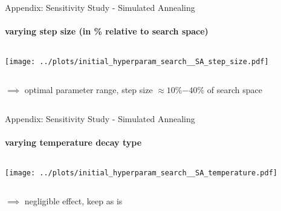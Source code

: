 \documentclass[11pt,aspectratio=169]{beamer}
\begin{document}
%
%

\begin{closingframe}{Appendix: Sensitivity Study - Simulated Annealing}
    \framesubtitle{varying \textbf{step size} (in \% relative to search space)}

    \begin{columns}
    \begin{column}{0.8\textwidth}
        \texttt{[image: ../plots/initial\_hyperparam\_search\_\_SA\_step\_size.pdf]}
    \end{column}
    \end{columns}

    \begin{columns}
        \begin{column}{0.8\textwidth}
            $\implies$ optimal parameter range, step size $\approx 10$\%$-40$\% of search space
        \end{column}
        \begin{column}{0.1\textwidth}
            \tiny{}
        \end{column}
    \end{columns}

\end{closingframe}

%
%

\begin{closingframe}{Appendix: Sensitivity Study - Simulated Annealing}
    \framesubtitle{varying \textbf{temperature decay type}}

    \begin{columns}
    \begin{column}{0.8\textwidth}
        \texttt{[image: ../plots/initial\_hyperparam\_search\_\_SA\_temperature.pdf]}
    \end{column}
    \end{columns}

    \begin{columns}
        \begin{column}{0.8\textwidth}
            $\implies$ negligible effect, keep as is
        \end{column}
        \begin{column}{0.1\textwidth}
            \tiny{}
        \end{column}
    \end{columns}
\end{closingframe}
\end{document}
